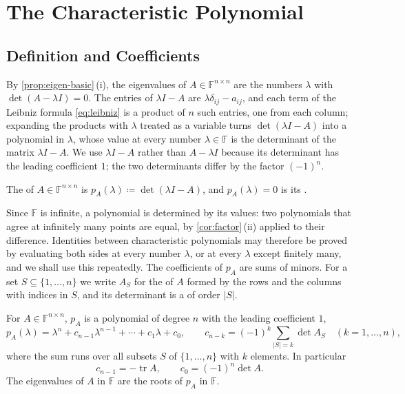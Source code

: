 \section{The Characteristic Polynomial}
\label{sec:characteristic-polynomial}

\subsection{Definition and Coefficients}

By \cref{prop:eigen-basic}\,(i), the eigenvalues of $A\in\mathbb F^{n\times n}$ are the numbers $\lambda$ with $\det(A-\lambda I)=0$. The entries of $\lambda I-A$ are $\lambda\delta_{ij}-a_{ij}$, and each term of the Leibniz formula \eqref{eq:leibniz} is a product of $n$ such entries, one from each column; expanding the products with $\lambda$ treated as a variable turns $\det(\lambda I-A)$ into a polynomial in $\lambda$, whose value at every number $\lambda\in\mathbb F$ is the determinant of the matrix $\lambda I-A$. We use $\lambda I-A$ rather than $A-\lambda I$ because its determinant has the leading coefficient $1$; the two determinants differ by the factor $(-1)^n$.

\begin{definition}
\label{def:characteristic-polynomial}
The  of $A\in\mathbb F^{n\times n}$ is $p_A(\lambda)\coloneqq\det(\lambda I-A)$, and $p_A(\lambda)=0$ is its .
\end{definition}

Since $\mathbb F$ is infinite, a polynomial is determined by its values: two polynomials that agree at infinitely many points are equal, by \cref{cor:factor}\,(ii) applied to their difference. Identities between characteristic polynomials may therefore be proved by evaluating both sides at every number $\lambda$, or at every $\lambda$ except finitely many, and we shall use this repeatedly. The coefficients of $p_A$ are sums of minors. For a set $S\subseteq\{1,\ldots,n\}$ we write $A_S$ for the  of $A$ formed by the rows and the columns with indices in $S$, and its determinant is a  of order $|S|$.

\begin{theorem}
\label{thm:charpoly-coefficients}
For $A\in\mathbb F^{n\times n}$, $p_A$ is a polynomial of degree $n$ with the leading coefficient $1$,
\[
p_A(\lambda)=\lambda^n+c_{n-1}\lambda^{n-1}+\cdots+c_1\lambda+c_0,\qquad c_{n-k}=(-1)^k\sum_{|S|=k}\det A_S\quad(k=1,\ldots,n),
\]
where the sum runs over all subsets $S$ of $\{1,\ldots,n\}$ with $k$ elements. In particular
\[
c_{n-1}=-\operatorname{tr}A,\qquad c_0=(-1)^n\det A .
\]
The eigenvalues of $A$ in $\mathbb F$ are the roots of $p_A$ in $\mathbb F$.
\end{theorem}

